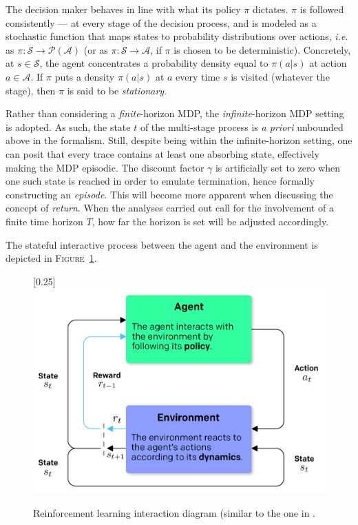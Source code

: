 The decision maker behaves in line with what its policy $\pi$ dictates.
$\pi$ is followed consistently --- at every stage of the decision process,
and is modeled as a stochastic function that
maps states to probability distributions over actions, \textit{i.e.}
as $\pi : \mathcal{S} \to \mathcal{P}(\mathcal{A})$
(or as $\pi : \mathcal{S} \to \mathcal{A}$, if $\pi$ is chosen to be deterministic).
Concretely, at $s \in \mathcal{S}$, the agent
concentrates a probability density equal to
$\pi(a | s)$ at action $a \in \mathcal{A}$.
If $\pi$ puts a density $\pi(a | s)$ at $a$ every time $s$ is visited (whatever the stage),
then $\pi$ is said to be \emph{stationary}.

Rather than considering a \emph{finite}-horizon MDP,
the \emph{infinite}-horizon MDP setting is adopted.
As such, the state $t$ of the multi-stage process is \textit{a priori} unbounded above in the formalism.
Still, despite being within the infinite-horizon setting,
one can posit that every trace contains at least one absorbing state,
effectively making the MDP episodic.
The discount factor $\gamma$ is artificially set to zero when one such state is reached
in order to emulate termination, hence formally constructing an \textit{episode}.
This will become more apparent when discussing the concept of \emph{return}.
When the analyses carried out call for the involvement of a finite time horizon $T$,
how far the horizon is set will be adjusted accordingly.

The stateful interactive process between the agent and the environment is depicted
in \textsc{Figure}~\ref{fig:rl}.

\begin{figure}
\center
\scalebox{0.25}[0.25]{\includegraphics{Diags/rl}}
\caption{Reinforcement learning interaction diagram (similar to the one in \cite{Sutton1998-ow}.}
\label{fig:rl}
\end{figure}

